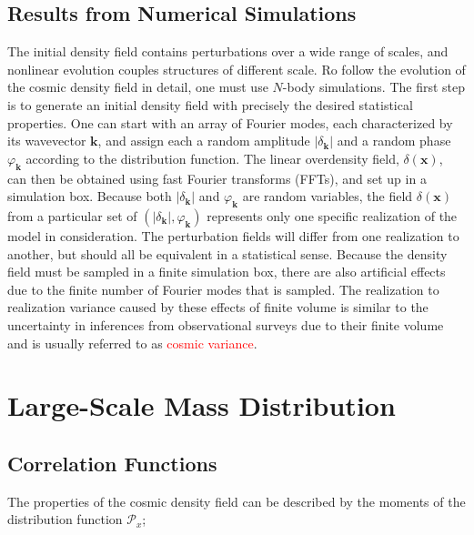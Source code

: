 \documentclass[12pt,a4paper]{article}
\renewcommand{\vec}[1]{\boldsymbol{#1}}
\begin{document}
\subsection{Results from Numerical Simulations}
\cite{2010gfe..book.....M} The initial density field contains perturbations over a wide range of scales, and nonlinear evolution couples structures of different scale. Ro follow the evolution of the cosmic density field in detail, one must use $N$-body simulations. The first step is to generate an initial density field with precisely the desired statistical properties. One can start with an array of Fourier modes, each characterized by its wavevector $\vec{k}$, and assign each a random amplitude $|\delta_{\vec{k}}|$ and a random phase $\varphi_{\vec{k}}$ according to the distribution function. The linear overdensity field, $\delta(\vec{x})$, can then be obtained using fast Fourier transforms (FFTs), and set up in a simulation box. Because both $|\delta_{\vec{k}}|$ and $\varphi_{\vec{k}}$ are random variables, the field $\delta(\vec{x})$ from a particular set of $(|\delta_{\vec{k}}|,\varphi_{\vec{k}})$ represents only one specific realization of the model in consideration. The perturbation fields will differ from one realization to another, but should all be equivalent in a statistical sense. Because the density field must be sampled in a finite simulation box, there are also artificial effects due to the finite number of Fourier modes that is sampled. The realization to realization variance caused by these effects of finite volume is similar to the uncertainty in inferences from observational surveys due to their finite volume and is usually referred to as \textcolor{red}{cosmic variance}.


\section{Large-Scale Mass Distribution}
\subsection{Correlation Functions}
\cite{2010gfe..book.....M} The properties of the cosmic density field can be described by the moments of the distribution function $\mathscr{P}_x$;
\end{document}
